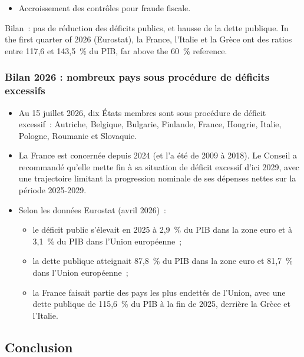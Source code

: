 \begin{itemize}
  \item Accroissement des contrôles pour fraude fiscale.
\end{itemize}

Bilan~: pas de réduction des déficits publics, et hausse de la dette publique. In the
first quarter of 2026 (Eurostat), la France, l'Italie et la Grèce ont des ratios entre
117,6 et 143,5~\% du PIB, far above the 60~\% reference.

\subsubsection{Bilan 2026 : nombreux pays sous procédure de déficits excessifs}

\begin{itemize}
  \item Au 15 juillet 2026, dix États membres sont sous procédure de déficit excessif~:
    Autriche, Belgique, Bulgarie, Finlande, France, Hongrie, Italie, Pologne, Roumanie
    et Slovaquie.
  \item La France est concernée depuis 2024 (et l'a été de 2009 à 2018). Le Conseil a
    recommandé qu'elle mette fin à sa situation de déficit excessif d'ici 2029, avec une
    trajectoire limitant la progression nominale de ses dépenses nettes sur la période
    2025-2029.
  \item Selon les données Eurostat (avril 2026)~:
    \begin{itemize}
      \item le déficit public s'élevait en 2025 à 2,9~\% du PIB dans la zone euro et à
        3,1~\% du PIB dans l'Union européenne~;
      \item la dette publique atteignait 87,8~\% du PIB dans la zone euro et 81,7~\% dans
        l'Union européenne~;
      \item la France faisait partie des pays les plus endettés de l'Union, avec une
        dette publique de 115,6~\% du PIB à la fin de 2025, derrière la Grèce et
        l'Italie.
    \end{itemize}
\end{itemize}

\subsection{Conclusion}

